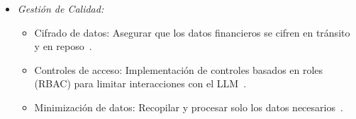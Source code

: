\documentclass[12pt]{article}
\begin{document}
\begin{enumerate}
\begin{itemize}
\begin{itemize}
                    \item \textbf{Prueba de Vectores e Incrustaciones (LLM08):} Manipulación de incrustaciones en Retrieval-Augmented Generation (RAG) para acceder a información no autorizada~\cite{fortanix}.
                    \item \textbf{Prueba de Anonimización y Seudonimización:} Verificación de que los datos financieros se anonimizan correctamente antes de ser procesados por el LLM~\cite{vstorm}.
                \end{itemize}
            \item \textit{Gestión de Calidad:}
                \begin{itemize}
                    \item Cifrado de datos: Asegurar que los datos financieros se cifren en tránsito y en reposo~\cite{lumenova}.
                    \item Controles de acceso: Implementación de controles basados en roles (RBAC) para limitar interacciones con el LLM~\cite{lumenova}.
                    \item Minimización de datos: Recopilar y procesar solo los datos necesarios~\cite{vstorm}.
                \end{itemize}
        \end{itemize}


\end{enumerate}
\end{document}
